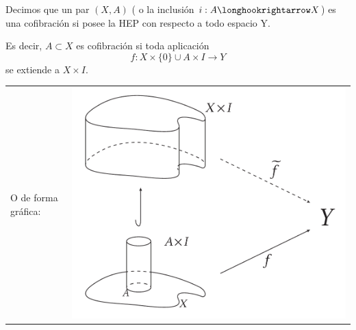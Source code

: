 \begin{defin}
Decimos que un par $(X,A)$ ( o la inclusión $i: A \longhookrightarrow X$) es una cofibración si posee la HEP con respecto a todo espacio Y. \par 
Es decir, $A \subset X$ es cofibración si toda aplicación  
\[ f : X \times \{0\} \cup A \times I \longrightarrow Y \]
se extiende a $X \times I$. \par
\begin{tabular}{ll}
\begin{minipage}{0.5\textwidth}
O de forma gráfica: 
\end{minipage}
&
\begin{minipage}{0.5\textwidth}
\includegraphics[width=0.7\linewidth]{images/cofibrac}
\end{minipage}
\end{tabular}

\end{defin}

